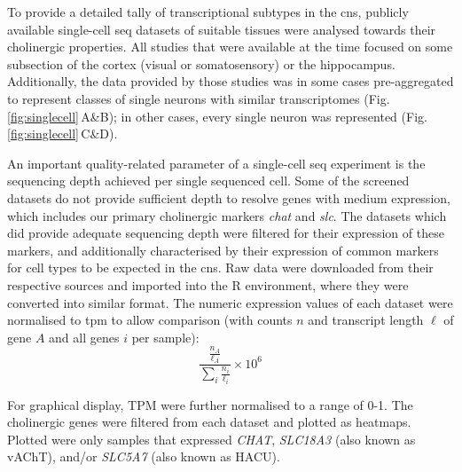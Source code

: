 \begin{method}

To provide a detailed tally of transcriptional subtypes in the \ac{cns}, publicly available single-cell \ac{seq} datasets of suitable tissues were analysed towards their cholinergic properties. All studies that were available at the time focused on some subsection of the cortex (visual or somatosensory) or the hippocampus. Additionally, the data provided by those studies was in some cases pre-aggregated to represent classes of single neurons with similar transcriptomes (Fig.\,\ref{fig:singlecell}\,A\&B\cite{Zeisel2015, Tasic2016}); in other cases, every single neuron was represented (Fig.\,\ref{fig:singlecell}\,C\&D\cite{Darmanis2015, Habib2016}). 

An important quality-related parameter of a single-cell \ac{seq} experiment is the sequencing depth achieved per single sequenced cell. Some of the screened datasets do not provide sufficient depth to resolve genes with medium expression, which includes our primary cholinergic markers \textit{\ac{chat}} and \textit{\ac{slc}}. The datasets which did provide adequate sequencing depth were filtered for their expression of these markers, and additionally characterised by their expression of common markers for cell types to be expected in the \ac{cns}. Raw data were downloaded from their respective sources and imported into the R environment, where they were converted into similar format. The numeric expression values of each dataset were normalised to \ac{tpm} to allow comparison (with counts $n$ and transcript length $\ell$ of gene $A$ and all genes $i$ per sample): $$\frac{\frac{n_A}{\ell_A}}{\sum_i \frac{n_i}{\ell_i}}\times 10^6$$

For graphical display, TPM were further normalised to a range of \num{0}-\num{1}. The cholinergic genes were filtered from each dataset and plotted as heatmaps. Plotted were only samples that expressed \emph{CHAT}, \emph{SLC18A3} (also known as vAChT), and/or \emph{SLC5A7} (also known as HACU).

\end{method}

